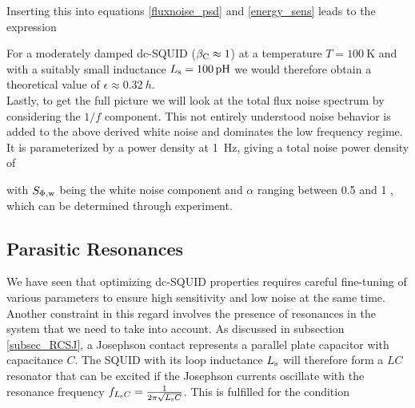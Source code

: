 Inserting this into equations \ref{fluxnoise_psd} and \ref{energy_sens} leads to the expression


For a moderately damped dc-SQUID ($\beta_{\rm C}\approx 1$) at a temperature $T=\qty{100}{\kelvin}$ and with a suitably small inductance $L_{\rm s}=\qty{100}{p\henry}$ we would therefore obtain a theoretical value of $\epsilon\approx \qty{0.32}{h}$. \\

Lastly, to get the full picture we will look at the total flux noise spectrum by considering the $1/f$ component. This not entirely understood noise behavior is added to the above derived white noise and dominates the low frequency regime. It is parameterized by a power density at \qty{1}{\hertz}, giving a total noise power density of      



with $S_{\rm \Phi,w}$ being the white noise component and $\alpha$ ranging between 0.5 and 1 \cite{Drung2011}, which can be determined through experiment.

\subsection{Parasitic Resonances}

We have seen that optimizing dc-SQUID properties requires careful fine-tuning of various parameters to ensure high sensitivity and low noise at the same time. Another constraint in this regard involves the presence of resonances in the system that we need to take into account. As discussed in subsection \ref{subsec_RCSJ}, a Josephson contact represents a parallel plate capacitor with capacitance $C$. The SQUID with its loop inductance $L_{\rm s}$ will therefore form a $LC$ resonator that can be excited if the Josephson currents oscillate with the resonance frequency $f_{L_{\rm s}C}=\frac{1}{2\pi\sqrt{L_{\rm s}C}}$. This is fulfilled for the condition 


